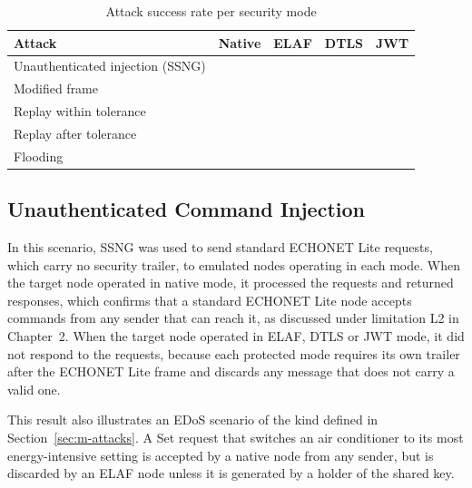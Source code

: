 \begin{table}[htbp]
  \centering
  \caption{Attack success rate per security mode}
  \label{tab:r-asr}
  \renewcommand{\arraystretch}{1.2}
  \begin{tabularx}{\textwidth}{@{}X c c c c@{}}
    \toprule
    \textbf{Attack}                        & \textbf{Native} & \textbf{ELAF} & \textbf{DTLS} & \textbf{JWT} \\
    \midrule
    Unauthenticated injection (SSNG)       & \tbd{}          & \tbd{}        & \tbd{}        & \tbd{}       \\
    Modified frame                         & \tbd{}          & \tbd{}        & \tbd{}        & \tbd{}       \\
    Replay within tolerance                & \tbd{}          & \tbd{}        & \tbd{}        & \tbd{}       \\
    Replay after tolerance                 & \tbd{}          & \tbd{}        & \tbd{}        & \tbd{}       \\
    Flooding                               & \tbd{}          & \tbd{}        & \tbd{}        & \tbd{}       \\
    \bottomrule
  \end{tabularx}
\end{table}

\subsection{Unauthenticated Command Injection}
\label{sec:r-injection}

In this scenario, SSNG was used to send standard ECHONET Lite requests, which carry no security trailer, to emulated nodes operating in each mode. When the target node operated in native mode, it processed the requests and returned responses, which confirms that a standard ECHONET Lite node accepts commands from any sender that can reach it, as discussed under limitation L2 in Chapter~2. When the target node operated in ELAF, DTLS or JWT mode, it did not respond to the requests, because each protected mode requires its own trailer after the ECHONET Lite frame and discards any message that does not carry a valid one.

This result also illustrates an EDoS scenario of the kind defined in Section~\ref{sec:m-attacks}. A Set request that switches an air conditioner to its most energy-intensive setting is accepted by a native node from any sender, but is discarded by an ELAF node unless it is generated by a holder of the shared key.


